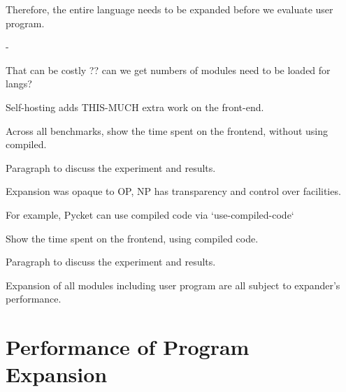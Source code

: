 		\begin{paragraph-here}
			Therefore, the entire language needs to be expanded before we evaluate user program.
		\end{paragraph-here}
-
		\begin{paragraph-here}
			That can be costly ?? can we get numbers of modules need to be loaded for langs?
		\end{paragraph-here}

		\begin{paragraph-here}
			Self-hosting adds THIS-MUCH extra work on the front-end.
		\end{paragraph-here}

		\begin{show-experiment}
			Across all benchmarks, show the time spent on the frontend, without using compiled.
		\end{show-experiment}

		\begin{paragraph-here}
			Paragraph to discuss the experiment and results.
		\end{paragraph-here}

		\begin{paragraph-here}
			Expansion was opaque to OP, NP has transparency and control over facilities.
		\end{paragraph-here}

		\begin{paragraph-here}
			For example, Pycket can use compiled code via `use-compiled-code`
		\end{paragraph-here}

		\begin{show-experiment}
			Show the time spent on the frontend, using compiled code.
		\end{show-experiment}

		\begin{paragraph-here}
			Paragraph to discuss the experiment and results.
		\end{paragraph-here}

		\begin{paragraph-here}
			Expansion of all modules including user program are all subject to expander's performance.
		\end{paragraph-here}


	\section{Performance of Program Expansion}
	\label{section:expander-performance}

